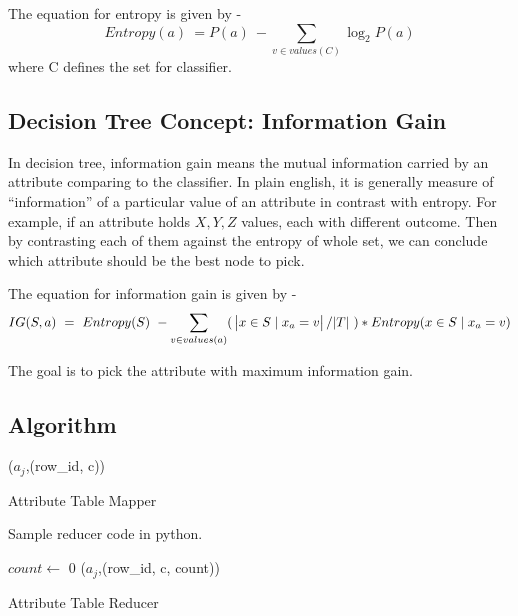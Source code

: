 \documentclass{article}
\begin{document}
The equation for entropy is given by -
\begin{equation}
Entropy(a)\ = P(a)\ - \sum_{v \in values(C)}\log_{2}{P(a)}
\end{equation}
where C defines the set for classifier.

\subsection{Decision Tree Concept: Information Gain}
In decision tree, information gain means the mutual information carried by an attribute comparing to the classifier\cite{wikiinfogain}. In plain english, it is generally measure of ``information'' of a particular value of an attribute in contrast with entropy. For example, if an attribute holds ${X,Y,Z}$ values, each with different outcome. Then by contrasting each of them against the entropy of whole set, we can conclude which attribute should be the best node to pick.

The equation for information gain is given by -
\begin{equation}
IG(S, a)\ =\ Entropy(S)\ - \sum_{v \in values(a)}(\ \abs{x \in S\mid x_{a} = v}/\abs{T}\ ) * Entropy(x \in S\mid x_{a} = v)
\end{equation}

The goal is to pick the attribute with maximum information gain.

\subsection{Algorithm}

\IncMargin{1em}
\begin{algorithm}[H]
\DontPrintSemicolon
{}
\BlankLine
\emit(${a_{j}}$,(row\_id, c))
\caption{Attribute Table Mapper\label{algo:atmap}} Sample reducer code in python. 
\end{algorithm}
\DecMargin{1em}

\IncMargin{1em}
\begin{algorithm}[H]
\DontPrintSemicolon
{}
\BlankLine
$count\leftarrow$ 0\;
\emit(${a_{j}}$,(row\_id, c, count))
\caption{Attribute Table Reducer\label{algo:atred}}
\end{algorithm}
\DecMargin{1em}
\end{document}

